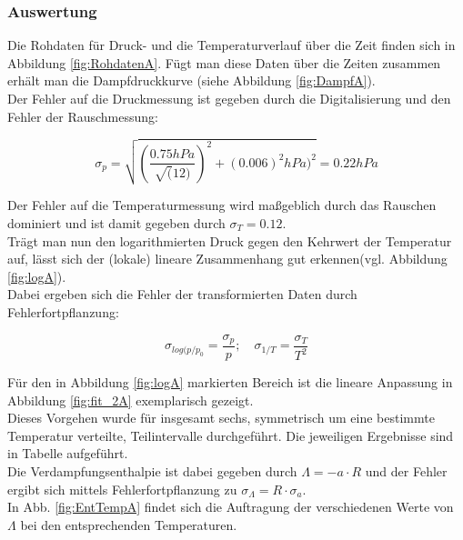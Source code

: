 \documentclass[12pt,a4paper]{article}
\begin{document}
\subsubsection{Auswertung}
Die Rohdaten für Druck- und die Temperaturverlauf über die Zeit finden sich in Abbildung \ref{fig:RohdatenA}. Fügt man diese Daten über die Zeiten zusammen erhält man die Dampfdruckkurve (siehe Abbildung \ref{fig:DampfA}).\\

Der Fehler auf die Druckmessung ist gegeben durch die Digitalisierung und den Fehler der Rauschmessung:

\begin{equation}
\sigma_p=\sqrt{(\frac{0.75 hPa}{\sqrt(12)})^2+(0.006)^2 hPa)^2}=0.22 hPa
\end{equation}

Der Fehler auf die Temperaturmessung wird maßgeblich durch das Rauschen dominiert und ist damit gegeben durch $\sigma_T=0.12$.\\
Trägt man nun den logarithmierten Druck gegen den Kehrwert der Temperatur auf, lässt sich der (lokale) lineare Zusammenhang gut erkennen(vgl. Abbildung \ref{fig:logA}).\\
Dabei ergeben sich die Fehler der transformierten Daten durch Fehlerfortpflanzung:

\begin{equation}
\sigma_{log(p/p_0}=\frac{\sigma_p}{p} ; \quad \sigma_{1/T}=\frac{\sigma_T}{T^2}
\end{equation}

Für den in Abbildung \ref{fig:logA} markierten Bereich ist die lineare Anpassung in Abbildung \ref{fig:fit_2A} exemplarisch gezeigt.\\


Dieses Vorgehen wurde für insgesamt sechs, symmetrisch um eine bestimmte Temperatur verteilte, Teilintervalle durchgeführt. Die jeweiligen Ergebnisse sind in Tabelle %
aufgeführt.\\
Die Verdampfungsenthalpie ist dabei gegeben durch $\Lambda=-a \cdot R$ und der Fehler ergibt sich mittels Fehlerfortpflanzung zu $\sigma_{\Lambda}=R \cdot \sigma_a$.\\
In Abb. \ref{fig:EntTempA} findet sich die Auftragung der verschiedenen Werte von $\Lambda$ bei den entsprechenden Temperaturen.
\end{document}
